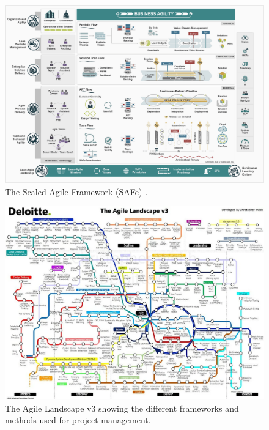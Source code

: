 \documentclass[12pt]{article}
\begin{document}
\begin{figure}
  \centering
  \includegraphics[width=\textwidth]{sAFE.png}
  \caption{The Scaled Agile Framework (SAFe) \cite{Framework}.}
  \label{fig:sAFE}
\end{figure}

\begin{figure}
  \centering
  \includegraphics[width=\textwidth]{the_agile_landscape.png}
  \caption{The Agile Landscape v3 \cite{DeloitteAuditConsulting} showing the different frameworks and methods used for project management.}
  \label{fig:the_agile_landscape}
\end{figure}

\newpage
\end{document}
